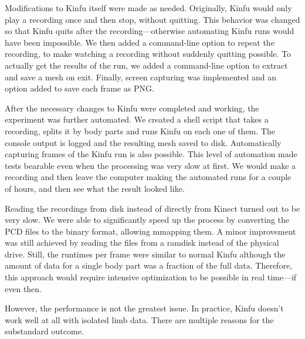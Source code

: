 Modifications to Kinfu itself were made as needed. Originally, Kinfu would only play a recording once and then stop, without quitting. This behavior was changed so that Kinfu quits after the recording---otherwise automating Kinfu runs would have been impossible. We then added a command-line option to repeat the recording, to make watching a recording without suddenly quitting possible. To actually get the results of the run, we added a command-line option to extract and save a mesh on exit. Finally, screen capturing was implemented and an option added to save each frame as PNG.

After the necessary changes to Kinfu were completed and working, the experiment was further automated. We created a shell script that takes a recording, splits it by body parts and runs Kinfu on each one of them. The console output is logged and the resulting mesh saved to disk. Automatically capturing frames of the Kinfu run is also possible. This level of automation made tests bearable even when the processing was very slow at first. We would make a recording and then leave the computer making the automated runs for a couple of hours, and then see what the result looked like.

Reading the recordings from disk instead of directly from Kinect turned out to be very slow. We were able to significantly speed up the process by converting the PCD files to the binary format, allowing mmapping them. A minor improvement was still achieved by reading the files from a ramdisk instead of the physical drive. Still, the runtimes per frame were similar to normal Kinfu although the amount of data for a single body part was a fraction of the full data. Therefore, this approach would require intensive optimization to be possible in real time---if even then.

However, the performance is not the greatest issue. In practice, Kinfu doesn't work well at all with isolated limb data. There are multiple reasons for the substandard outcome.

